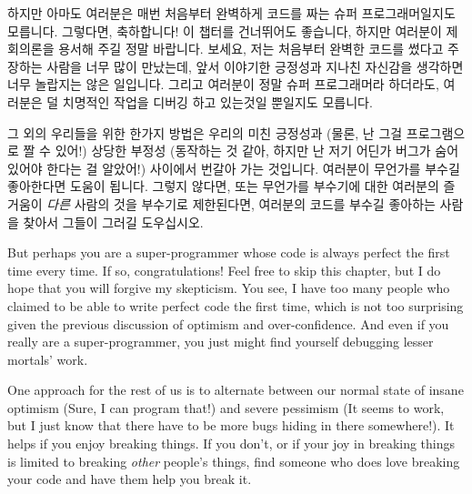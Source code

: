 {	

}\QuickQuizEnd

하지만 아마도 여러분은 매번 처음부터 완벽하게 코드를 짜는 슈퍼 프로그래머일지도
모릅니다.
그렇다면, 축하합니다!
이 챕터를 건너뛰어도 좋습니다, 하지만 여러분이 제 회의론을 용서해 주길 정말
바랍니다.
보세요, 저는 처음부터 완벽한 코드를 썼다고 주장하는 사람을 너무 많이 만났는데,
앞서 이야기한 긍정성과 지나친 자신감을 생각하면 너무 놀랍지는 않은 일입니다.
그리고 여러분이 정말 슈퍼 프로그래머라 하더라도, 여러분은 덜 치명적인 작업을
디버깅 하고 있는것일 뿐일지도 모릅니다.

그 외의 우리들을 위한 한가지 방법은 우리의 미친 긍정성과 (물론, 난 그걸
프로그램으로 짤 수 있어!) 상당한 부정성 (동작하는 것 같아, 하지만 난 저기
어딘가 버그가 숨어 있어야 한다는 걸 알았어!) 사이에서 번갈아 가는 것입니다.
여러분이 무언가를 부수길 좋아한다면 도움이 됩니다.
그렇지 않다면, 또는 무언가를 부수기에 대한 여러분의 즐거움이 \emph{다른} 사람의
것을 부수기로 제한된다면, 여러분의 코드를 부수길 좋아하는 사람을 찾아서 그들이
그러길 도우십시오.

\iffalse

But perhaps you are a super-programmer whose code is always perfect
the first time every time.
If so, congratulations!
Feel free to skip this chapter, but
I do hope that you will forgive my skepticism.
You see, I have too many people who claimed to be able to write perfect
code the first time, which is not too surprising given the previous
discussion of optimism and over-confidence.
And even if you really are a super-programmer, you just might
find yourself debugging lesser mortals' work.

One approach for the rest of us is to alternate between our normal
state of insane optimism
(Sure, I can program that!) and severe pessimism
(It seems to work, but I just know that there have to be more bugs hiding
in there somewhere!).
It helps if you enjoy breaking things.
If you don't, or if your joy in breaking things is limited to breaking
\emph{other} people's things, find someone who does love breaking your
code and have them help you break it.

